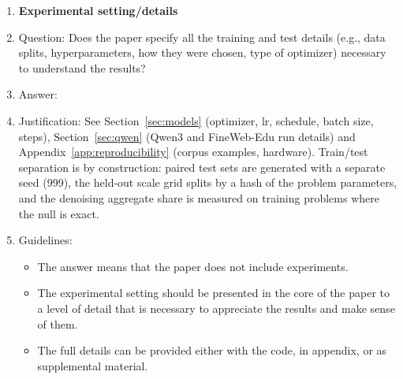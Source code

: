 \documentclass{article}
\begin{document}
\begin{enumerate}
\item {\bf Experimental setting/details}
    \item[] Question: Does the paper specify all the training and test details (e.g., data splits, hyperparameters, how they were chosen, type of optimizer) necessary to understand the results?
    \item[] Answer: \answerYes{}
    \item[] Justification: See Section~\ref{sec:models} (optimizer, lr, schedule, batch size, steps), Section~\ref{sec:qwen} (Qwen3 and FineWeb-Edu run details) and Appendix~\ref{app:reproducibility} (corpus examples, hardware). Train/test separation is by construction: paired test sets are generated with a separate seed (999), the held-out scale grid splits by a hash of the problem parameters, and the denoising aggregate share is measured on training problems where the null is exact.
    \item[] Guidelines:
    \begin{itemize}
        \item The answer \answerNA{} means that the paper does not include experiments.
        \item The experimental setting should be presented in the core of the paper to a level of detail that is necessary to appreciate the results and make sense of them.
        \item The full details can be provided either with the code, in appendix, or as supplemental material.
    \end{itemize}


\end{enumerate}
\end{document}
